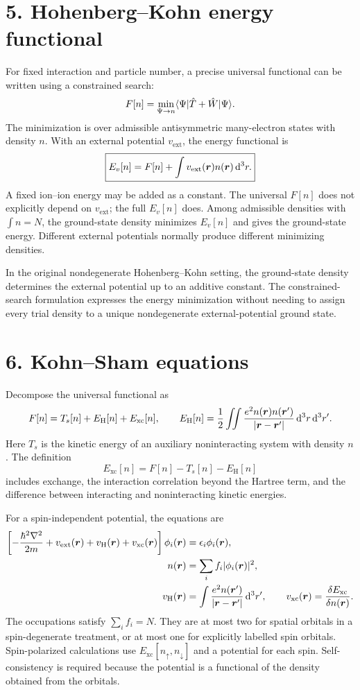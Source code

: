 \section*{5. Hohenberg--Kohn energy functional}
For fixed interaction and particle number, a precise universal functional can be written using a constrained search:
\[
F[n]=\min_{\Psi\to n}\langle\Psi\rvert\hat T+\hat W\lvert\Psi\rangle.
\]
The minimization is over admissible antisymmetric many-electron states with density $n$. With an external potential $v_{\mathrm{ext}}$, the energy functional is
\[
\boxed{E_v[n]=F[n]+\int v_{\mathrm{ext}}(\boldsymbol{r})n(\boldsymbol{r})\mathop{}\!\mathrm{d}^3r.}
\]
A fixed ion--ion energy may be added as a constant. The universal $F[n]$ does not explicitly depend on $v_{\mathrm{ext}}$; the full $E_v[n]$ does. Among admissible densities with $\int n=N$, the ground-state density minimizes $E_v[n]$ and gives the ground-state energy. Different external potentials normally produce different minimizing densities.

In the original nondegenerate Hohenberg--Kohn setting, the ground-state density determines the external potential up to an additive constant. The constrained-search formulation expresses the energy minimization without needing to assign every trial density to a unique nondegenerate external-potential ground state.

\section*{6. Kohn--Sham equations}
Decompose the universal functional as
\[
F[n]=T_s[n]+E_{\mathrm H}[n]+E_{\mathrm{xc}}[n],\qquad
E_{\mathrm H}[n]=\frac12\iint\frac{e^2n(\boldsymbol{r})n(\boldsymbol{r}')}{|\boldsymbol{r}-\boldsymbol{r}'|}\mathop{}\!\mathrm{d}^3r\mathop{}\!\mathrm{d}^3r'.
\]
Here $T_s$ is the kinetic energy of an auxiliary noninteracting system with density $n$. The definition
\[
E_{\mathrm{xc}}[n]=F[n]-T_s[n]-E_{\mathrm H}[n]
\]
includes exchange, the interaction correlation beyond the Hartree term, and the difference between interacting and noninteracting kinetic energies.

For a spin-independent potential, the equations are
\begin{align*}
\left[-\frac{\hbar^2\nabla^2}{2m}+v_{\mathrm{ext}}(\boldsymbol{r})
+v_{\mathrm H}(\boldsymbol{r})+v_{\mathrm{xc}}(\boldsymbol{r})\right]\phi_i(\boldsymbol{r})
&=\epsilon_i\phi_i(\boldsymbol{r}),\\
n(\boldsymbol{r})&=\sum_i f_i|\phi_i(\boldsymbol{r})|^2,\\
v_{\mathrm H}(\boldsymbol{r})&=\int\frac{e^2n(\boldsymbol{r}')}{|\boldsymbol{r}-\boldsymbol{r}'|}\mathop{}\!\mathrm{d}^3r',\qquad
v_{\mathrm{xc}}(\boldsymbol{r})=\frac{\delta E_{\mathrm{xc}}}{\delta n(\boldsymbol{r})}.
\end{align*}
The occupations satisfy $\sum_i f_i=N$. They are at most two for spatial orbitals in a spin-degenerate treatment, or at most one for explicitly labelled spin orbitals. Spin-polarized calculations use $E_{\mathrm{xc}}[n_\uparrow,n_\downarrow]$ and a potential for each spin. Self-consistency is required because the potential is a functional of the density obtained from the orbitals.

